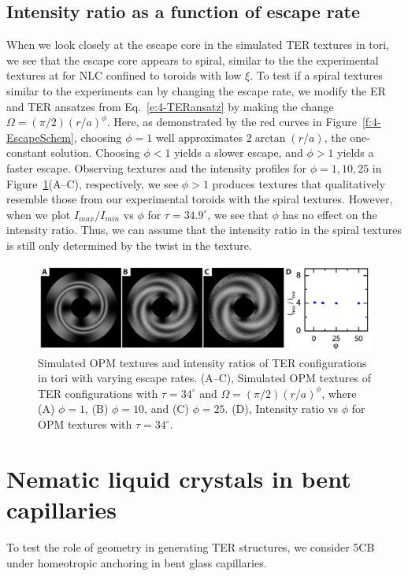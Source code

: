 \subsection{Intensity ratio as a function of escape rate}
When we look closely at the escape core in the simulated TER textures in tori, we see that the escape core appears to spiral, similar to the the experimental textures at for NLC confined to toroids with low $\xi$.
To test if a spiral textures similar to the experiments can by changing the escape rate, we modify the ER and TER ansatzes from Eq.~\ref{e:4-TERansatz} by making the change $\Omega = (\pi/2)(r/a)^{\phi}$.
Here, as demonstrated by the red curves in Figure~\ref{f:4-EscapeSchem}, choosing $\phi = 1$ well approximates $2 \arctan(r/a)$, the one-constant solution.
Choosing $\phi < 1$ yields a slower escape, and $\phi > 1$ yields a faster escape.
Observing textures and the intensity profiles for $\phi = 1,10,25$ in Figure~\ref{f:4-I0I45vsEscape}(A--C), respectively, we see $\phi > 1$ produces textures that qualitatively resemble those from our experimental toroids with the spiral textures.
However, when we plot $I_{max}/I_{min}$ vs $\phi$ for $\tau = 34.9^{\circ}$, we see that $\phi$ has no effect on the intensity ratio.
Thus, we can assume that the intensity ratio in the spiral textures is still only determined by the twist in the texture.
\begin{figure}
  \centering
  \includegraphics{figures/C4/Ch4-Figs_I0I45vsEscape.png}
  \caption{Simulated OPM textures and intensity ratios of TER configurations in tori with varying escape rates.
  (A--C), Simulated OPM textures of TER configurations with $\tau = 34^\circ$ and $\Omega = (\pi/2)(r/a)^{\phi}$, where (A) $\phi = 1$, (B) $\phi = 10$, and (C) $\phi = 25$.
  (D), Intensity ratio vs $\phi$ for OPM textures with $\tau = 34^\circ$.}\label{f:4-I0I45vsEscape}
\end{figure}

\section{Nematic liquid crystals in bent capillaries}
To test the role of geometry in generating TER structures, we consider 5CB under homeotropic anchoring in bent glass capillaries.
